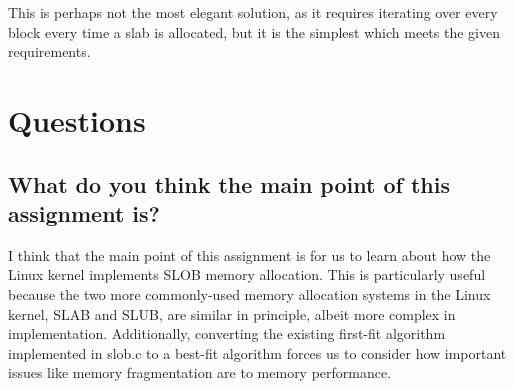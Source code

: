 \documentclass[letterpaper,10pt,titlepage,draftclsnofoot,onecolumn]{article}
\begin{document}
This is perhaps not the most elegant solution, as it requires iterating over every block every time
a slab is allocated, but it is the simplest which meets the given requirements.

\section{Questions}

\subsection{What do you think the main point of this assignment is?}
I think that the main point of this assignment is for us to learn about how the Linux kernel implements SLOB memory allocation. This is particularly useful because the two more commonly-used memory allocation systems in the Linux kernel, SLAB and SLUB, are similar in principle, albeit more complex in implementation. Additionally, converting the existing first-fit algorithm implemented in slob.c to a best-fit algorithm forces us to consider how important issues like memory fragmentation are to memory performance.
\end{document}
